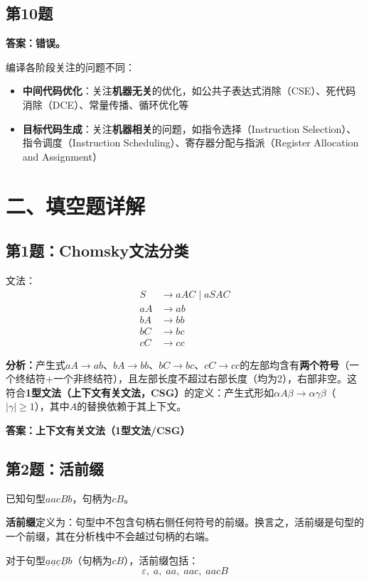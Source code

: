 \documentclass[12pt,a4paper,fontset=fandol]{ctexart}
\begin{document}
\subsection*{第10题}
\textbf{答案：错误。}

编译各阶段关注的问题不同：
\begin{itemize}
    \item \textbf{中间代码优化}：关注\textbf{机器无关}的优化，如公共子表达式消除（CSE）、死代码消除（DCE）、常量传播、循环优化等
    \item \textbf{目标代码生成}：关注\textbf{机器相关}的问题，如指令选择（Instruction Selection）、指令调度（Instruction Scheduling）、寄存器分配与指派（Register Allocation and Assignment）
\end{itemize}


\section{二、填空题详解}

\subsection*{第1题：Chomsky文法分类}
文法：
\[
\begin{aligned}
S &\to aAC \mid aSAC \\
aA &\to ab \\
bA &\to bb \\
bC &\to bc \\
cC &\to cc
\end{aligned}
\]

\textbf{分析：}产生式$aA \to ab$、$bA \to bb$、$bC \to bc$、$cC \to cc$的左部均含有\textbf{两个符号}（一个终结符+一个非终结符），且左部长度不超过右部长度（均为2），右部非空。这符合\textbf{1型文法（上下文有关文法，CSG）}的定义：产生式形如$\alpha A\beta \to \alpha\gamma\beta$（$|\gamma| \ge 1$），其中$A$的替换依赖于其上下文。

\textbf{答案：上下文有关文法（1型文法/CSG）}

\subsection*{第2题：活前缀}
已知句型$aacBb$，句柄为$cB$。

\textbf{活前缀}定义为：句型中不包含句柄右侧任何符号的前缀。换言之，活前缀是句型的一个前缀，其在分析栈中不会越过句柄的右端。

对于句型$\underline{a}\underline{a}\underline{c}\underline{B}b$（句柄为$cB$），活前缀包括：
\[
\varepsilon,\; a,\; aa,\; aac,\; aacB
\]
\end{document}
